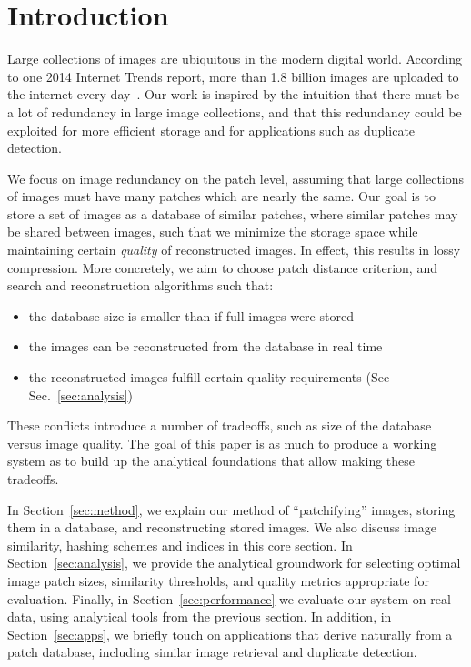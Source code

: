 \section{Introduction}

Large collections of images are ubiquitous in the modern digital world.
According to one 2014 Internet Trends report,
more than 1.8 billion images are uploaded to the internet every day~\cite{meeker2014internet}.
Our work is inspired by the intuition that there must be a lot of redundancy
in large image collections, and that this redundancy could
be exploited for more efficient storage and for applications such as duplicate detection.

We focus on image redundancy on the patch level, assuming that large collections
of images must have many patches which are nearly the same.
Our goal is to store a set of images as a database of
similar patches, where similar patches may be shared between images,
 such that we minimize the storage space while maintaining certain \emph{quality}
of reconstructed images. In effect, this results in lossy compression. More concretely,
we aim to choose patch distance criterion, and search and reconstruction algorithms such
that:
\begin{itemize}
\item the database size is smaller than if full images were stored
\item the images can be reconstructed from the database in real time
\item the reconstructed images fulfill certain quality requirements (See Sec.~\ref{sec:analysis})
\end{itemize}
These conflicts introduce a number of tradeoffs, such as size of
the database versus image quality.
The goal of this paper is as much to produce a working system as to
build up the analytical foundations that allow making these tradeoffs.

In Section~\ref{sec:method}, we explain our method of ``patchifying'' images,
storing them in a database, and reconstructing stored images. We also
discuss image similarity, hashing schemes and indices in this core section.
In Section~\ref{sec:analysis}, we provide the analytical groundwork for
selecting optimal image patch sizes, similarity thresholds, and quality metrics
appropriate for evaluation. Finally, in Section~\ref{sec:performance}
we evaluate our system on real data, using analytical tools from the previous section.
In addition, in Section~\ref{sec:apps}, we briefly touch on applications that derive naturally
from a patch database, including similar image retrieval and duplicate detection.
